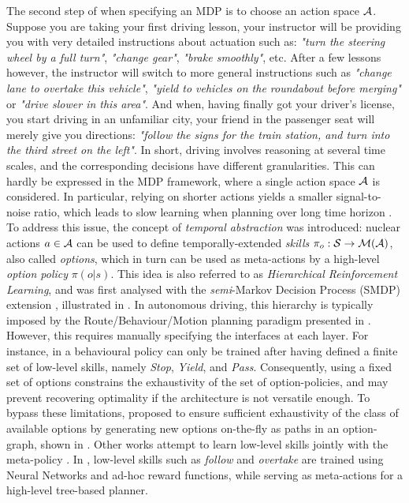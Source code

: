 The second step of when specifying an MDP is to choose an action space $\mathcal{A}$. Suppose you are taking your first driving lesson, your instructor will be providing you with very detailed instructions about actuation such as: \emph{"turn the steering wheel by a full turn"}, \emph{"change gear"}, \emph{"brake smoothly"}, etc. After a few lessons however, the instructor will switch to more general instructions such as \emph{"change lane to overtake this vehicle"}, \emph{"yield to vehicles on the roundabout before merging"} or \emph{"drive slower in this area"}. And when, having finally got your driver's license, you start driving in an unfamiliar city, your friend in the passenger seat will merely give you directions: \emph{"follow the signs for the train station, and turn into the third street on the left"}. In short, driving involves reasoning at several time scales, and the corresponding decisions have different granularities. This can hardly be expressed in the MDP framework, where a single action space $\mathcal{A}$ is considered. In particular, relying on shorter actions yields a smaller signal-to-noise ratio, which leads to slow learning when planning over long time horizon \citep{ShalevShwartz2017}. To address this issue, the concept of \emph{temporal abstraction} was introduced: nuclear actions $a\in\mathcal{A}$ can be used to define temporally-extended \emph{skills} $\pi_o:\mathcal{S} \rightarrow \mathcal{M}(\mathcal{A})$, also called \emph{options}, which in turn can be used as meta-actions by a high-level \emph{option policy} $\pi(o|s)$. This idea is also referred to as \emph{Hierarchical Reinforcement Learning}, and was first analysed with the \emph{semi}-Markov Decision Process (SMDP) extension \citep{Sutton1999}, illustrated in . In autonomous driving, this hierarchy is typically imposed by the Route/Behaviour/Motion planning paradigm presented in . However, this requires manually specifying the interfaces at each layer. For instance, in \citep{Barbier2018} a behavioural policy can only be trained after having defined a finite set of low-level skills, namely \emph{Stop}, \emph{Yield}, and \emph{Pass}. Consequently, using a fixed set of options constrains the exhaustivity of the set of option-policies, and may prevent recovering optimality if the architecture is not versatile enough. To bypass these limitations, \citet{ShalevShwartz2016} proposed to ensure sufficient exhaustivity of the class of available options by generating new options on-the-fly as paths in an option-graph, shown in . Other works attempt to learn low-level skills jointly with the meta-policy \citep{Bacon2017,Vezhnevets2017,Heess2016}. In \citep{Paxton2017}, low-level skills such as \emph{follow} and \emph{overtake} are trained using Neural Networks and ad-hoc reward functions, while serving as meta-actions for a high-level tree-based planner.

